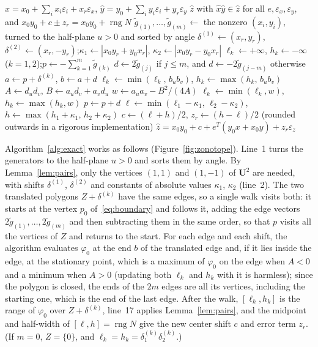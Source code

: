 \documentclass[10pt]{article}
\newcommand{\seg}[2]{\overline{#1\,#2}}
\theoremstyle{definition}
\newcommand{\U}{\mathbf{U}}
\newcommand{\eps}{\varepsilon}
\newcommand{\ex}{\eps_x}
\newcommand{\ey}{\eps_y}
\newcommand{\rng}{\operatorname{rng}}
\begin{document}
\begin{algorithm}[H]
\caption{Exact multiplication of reduced affine forms}
\label{alg:exact}
\begin{algorithmic}[1]
\Require $\hat x = x_0+\sum_ix_i\eps_i+x_r\ex$, $\hat y = y_0+\sum_iy_i\eps_i+y_r\ey$
\Ensure $\hat z$ with $\hat x\hat y\in\hat z$ for all $e,\ex,\ey$, and $x_0y_0+c\pm z_r = x_0y_0+\rng N$
\State $\tilde g_{(1)},\dots,\tilde g_{(m)}\gets$ the nonzero $(x_i,y_i)$, turned to the half-plane $u>0$ and sorted by angle
\State $\delta^{(1)}\gets(x_r,y_r)$, $\delta^{(2)}\gets(x_r,-y_r)$;\quad $\kappa_1\gets|x_0y_r+y_0x_r|$, $\kappa_2\gets|x_0y_r-y_0x_r|$
\State $\ell_k\gets+\infty$, $h_k\gets-\infty$ ($k=1,2$);\quad $p\gets-\sum_{k=1}^m\tilde g_{(k)}$ 
  \State $d\gets2\tilde g_{(j)}$ if $j\le m$, and $d\gets-2\tilde g_{(j-m)}$ otherwise
   \Comment{the edge $\seg{p}{(p+d)}$, translated by $\delta^{(k)}$}
    \State $a\gets p+\delta^{(k)}$, $b\gets a+d$
    \State $\ell_k\gets\min(\ell_k,\,b_ub_v)$, $h_k\gets\max(h_k,\,b_ub_v)$
    \State $A\gets d_ud_v$, $B\gets a_ud_v+a_vd_u$
      \State $w\gets a_ua_v-B^2/(4A)$
      \State $\ell_k\gets\min(\ell_k,w)$, $h_k\gets\max(h_k,w)$
    \EndIf
  \EndFor
  \State $p\gets p+d$
\EndFor
\State $\ell\gets\min(\ell_1-\kappa_1,\,\ell_2-\kappa_2)$, $h\gets\max(h_1+\kappa_1,\,h_2+\kappa_2)$
\State $c\gets(\ell+h)/2$, $z_r\gets(h-\ell)/2$ (rounded outwards in a rigorous implementation)
\State \Return $\hat z = x_0y_0+c+e^T(y_0x+x_0y)+z_r\eps_z$
\end{algorithmic}
\end{algorithm}

Algorithm~\ref{alg:exact} works as follows (Figure~\ref{fig:zonotope}). Line~1 turns the generators to the half-plane $u>0$ and sorts them by angle. By Lemma~\ref{lem:pairs}, only the vertices $(1,1)$ and $(1,-1)$ of $\U^2$ are needed, with shifts $\delta^{(1)}$, $\delta^{(2)}$ and constants of absolute values $\kappa_1$, $\kappa_2$ (line~2). The two translated polygons $Z+\delta^{(k)}$ have the same edges, so a single walk visits both: it starts at the vertex $p_0$ of~\eqref{eq:boundary} and follows it, adding the edge vectors $2\tilde g_{(1)},\dots,2\tilde g_{(m)}$ and then subtracting them in the same order, so that $p$ visits all the vertices of $Z$ and returns to the start. For each edge and each shift, the algorithm evaluates $\varphi_0$ at the end $b$ of the translated edge and, if it lies inside the edge, at the stationary point, which is a maximum of $\varphi_0$ on the edge when $A<0$ and a minimum when $A>0$ (updating both $\ell_k$ and $h_k$ with it is harmless); since the polygon is closed, the ends of the $2m$ edges are all its vertices, including the starting one, which is the end of the last edge. After the walk, $[\ell_k,h_k]$ is the range of $\varphi_0$ over $Z+\delta^{(k)}$, line~17 applies Lemma~\ref{lem:pairs}, and the midpoint and half-width of $[\ell,h]=\rng N$ give the new center shift $c$ and error term $z_r$. (If $m=0$, $Z=\{0\}$, and $\ell_k=h_k=\delta^{(k)}_1\delta^{(k)}_2$.)
\end{document}
